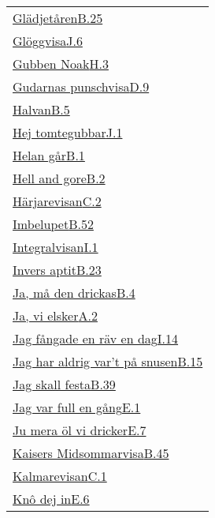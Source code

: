 \begin{longtable}[h]{@{}p{\linewidth}@{}}
  \hyperref[gladjetaren]{Glädjetåren}\dotfill\hyperref[gladjetaren]{B.25}\\
  \hyperref[gloggvisa]{Glöggvisa}\dotfill\hyperref[gloggvisa]{J.6}\\
  \hyperref[fredmanssangno35]{Gubben Noak}\dotfill\hyperref[fredmanssangno35]{H.3}\\
  \hyperref[gudarnaspunschvisa]{Gudarnas punschvisa}\dotfill\hyperref[gudarnaspunschvisa]{D.9}\\
  \hyperref[halvan]{Halvan}\dotfill\hyperref[halvan]{B.5}\\
  \hyperref[hejtomtegubbar]{Hej tomtegubbar}\dotfill\hyperref[hejtomtegubbar]{J.1}\\
  \hyperref[helan]{Helan går}\dotfill\hyperref[helan]{B.1}\\
  \hyperref[hellandgore]{Hell and gore}\dotfill\hyperref[hellandgore]{B.2}\\
  \hyperref[harjarevisan]{Härjarevisan}\dotfill\hyperref[harjarevisan]{C.2}\\
  \hyperref[imbelupet]{Imbelupet}\dotfill\hyperref[imbelupet]{B.52}\\
  \hyperref[integralvisan]{Integralvisan}\dotfill\hyperref[integralvisan]{I.1}\\
  \hyperref[inversaptit]{Invers aptit}\dotfill\hyperref[inversaptit]{B.23}\\
  \hyperref[jamadendrickas]{Ja, må den drickas}\dotfill\hyperref[jamadendrickas]{B.4}\\
  \hyperref[vielsker]{Ja, vi elsker}\dotfill\hyperref[vielsker]{A.2}\\
  \hyperref[raven]{Jag fångade en räv en dag}\dotfill\hyperref[raven]{I.14}\\
  \hyperref[snusen]{Jag har aldrig var't på snusen}\dotfill\hyperref[snusen]{B.15}\\
  \hyperref[jagskallfesta]{Jag skall festa}\dotfill\hyperref[jagskallfesta]{B.39}\\
  \hyperref[jagvarfullengang]{Jag var full en gång}\dotfill\hyperref[jagvarfullengang]{E.1}\\
  \hyperref[jumeraolvidricker]{Ju mera öl vi dricker}\dotfill\hyperref[jumeraolvidricker]{E.7}\\
  \hyperref[kaisersmidsommarvisa]{Kaisers Midsommarvisa}\dotfill\hyperref[kaisersmidsommarvisa]{B.45}\\
  \hyperref[kalmarevisan]{Kalmarevisan}\dotfill\hyperref[kalmarevisan]{C.1}\\
  \hyperref[knodejin]{Knô dej in}\dotfill\hyperref[knodejin]{E.6}\\

\end{longtable}
